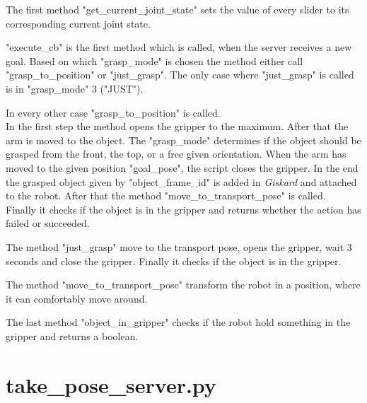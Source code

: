 \documentclass[main.tex]{subfiles}
\begin{document}
			 \vspace{0,75 cm}
			 The first method "get\_current\_joint\_state"  sets the value of every slider to its corresponding current joint state.
			 
			 \vspace{0,25 cm}
			 "execute\_cb" is the first method which is called, when the server receives a new goal. Based on which "grasp\_mode" is chosen the method either call "grasp\_to\_position" or "just\_grasp". The only case where "just\_grasp" is called is in "grasp\_mode" 3 ("JUST").
			 
			 \vspace{0,25 cm}
			 In every other case "grasp\_to\_position" is called.\\
			In the first step the method opens the gripper to the maximum. After that the arm is moved to the object. The "grasp\_mode" determines if the object should be grasped from the front, the top, or a free given orientation. When the arm has moved to the given position "goal\_pose", the script closes the gripper. In the end the grasped object given by "object\_frame\_id" is added in \textit{Giskard} and attached to the robot. After that the method "move\_to\_transport\_pose" is called.\\
			Finally it checks if the object is in the gripper and returns whether the action has failed or succeeded.
			
			\vspace{0,25 cm}
			The method "just\_grasp" move to the transport pose, opens the gripper, wait 3 seconds and close the gripper. Finally it checks if the object is in the gripper.
			
			\vspace{0,25 cm}
			The method "move\_to\_transport\_pose" transform the robot in a position, where it can comfortably move around.
			
			\vspace{0,25 cm}
			The last method "object\_in\_gripper" checks if the robot hold something in the gripper and returns a boolean.\\
			
			\section{take\_pose\_server.py} 
			
\end{document}
